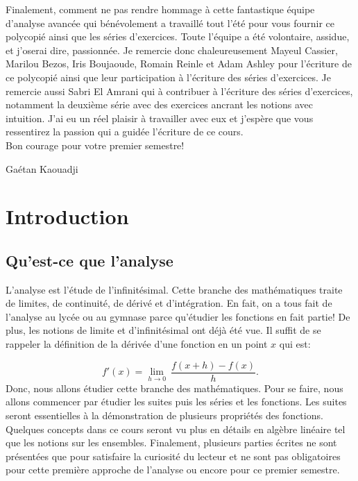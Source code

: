 \documentclass[oneside,12pt,french,table]{book}
\theoremstyle{definition}
\theoremstyle{plain}
\theoremstyle{remark}
\begin{document}
Finalement, comment ne pas rendre hommage à cette fantastique équipe d'analyse avancée qui bénévolement a travaillé tout l'été pour vous fournir ce polycopié ainsi que les séries d'exercices. Toute l'équipe a été volontaire, assidue, et j'oserai dire, passionnée. Je remercie donc chaleureusement Mayeul Cassier, Marilou Bezos, Iris Boujaoude, Romain Reinle et Adam Ashley pour l'écriture de ce polycopié ainsi que leur participation à l'écriture des séries d'exercices. Je remercie aussi Sabri El Amrani qui à contribuer à l'écriture des séries d'exercices, notamment la deuxième série avec des exercices ancrant les notions avec intuition. J'ai eu un réel plaisir à travailler avec eux et j'espère que vous ressentirez la passion qui a guidée l'écriture de ce cours. \\

\noindent
Bon courage pour votre premier semestre!

\noindent
Gaétan Kaouadji

\chapter{Introduction}

\section{Qu'est-ce que l'analyse}

L'analyse est l'étude de l'infinitésimal. Cette branche des mathématiques traite de limites, de continuité, de dérivé et d'intégration. En fait, on a tous fait de l'analyse au lycée ou au gymnase parce qu'étudier les fonctions en fait partie! De plus, les notions de limite et d'infinitésimal ont déjà été vue. Il suffit de se rappeler la définition de la dérivée d'une fonction en un point $x$ qui est: 

\begin{equation}
    f'(x)=\lim_{h\to 0}~\dfrac{f(x+h)-f(x)}{h}.
\end{equation}
Donc, nous allons étudier cette branche des mathématiques. Pour se faire, nous allons commencer par étudier les suites puis les séries et les fonctions. Les suites seront essentielles à la démonstration de plusieurs propriétés des fonctions. Quelques concepts dans ce cours seront vu plus en détails en algèbre linéaire tel que les notions sur les ensembles. Finalement, plusieurs parties écrites ne sont présentées que pour satisfaire la curiosité du lecteur et ne sont pas obligatoires pour cette première approche de l'analyse ou encore pour ce premier semestre. 
\end{document}
